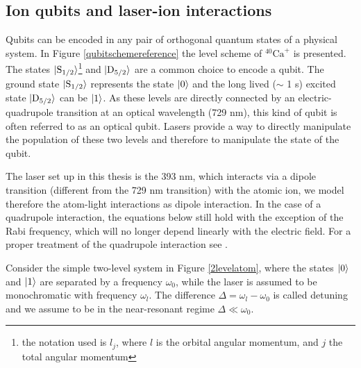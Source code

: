 \subsection{Ion qubits and laser-ion interactions}
\label{laserioninteractions}
Qubits can be encoded in any pair of orthogonal quantum states of a physical system. %
In Figure \ref{qubitschemereference} the level scheme of $^{40}\text{Ca}^+$ is presented. The states $\ket{\text{S}_{1/2}}$\footnote{the notation used is $l_j$, where $l$ is the orbital angular momentum, and $j$ the total angular momentum} and $\ket{\text{D}_{5/2}}$ are a common choice to encode a qubit. The ground state $\ket{\text{S}_{1/2}}$ represents the state $\ket{0}$ and the long lived ($\sim$ 1 s) excited state $\ket{\text{D}_{5/2}}$ can be $\ket{1}$. As these levels are directly connected by an electric-quadrupole transition at an optical wavelength (729 nm), this kind of qubit is often referred to as an optical qubit.
Lasers provide a way to directly manipulate the population of these two levels and therefore to manipulate the state of the qubit.\par
The laser set up in this thesis is the 393 nm, which interacts via a dipole transition (different from the 729 nm transition) with the atomic ion, we model therefore the atom-light interactions as dipole interaction. In the case of a quadrupole interaction, the equations below still hold with the exception of the Rabi frequency, which will no longer depend linearly with the electric field. For a proper treatment of the quadrupole interaction see \cite{ross}.\par
Consider the simple two-level system in Figure \ref{2levelatom}, where the states $\ket{0}$ and $\ket{1}$ are separated by a frequency $\omega_0$, while the laser is assumed to be monochromatic with frequency $\omega_l$. The difference $\Delta = \omega_l -\omega_0$ is called detuning and we assume to be in the near-resonant regime $\Delta \ll \omega_0$. %
